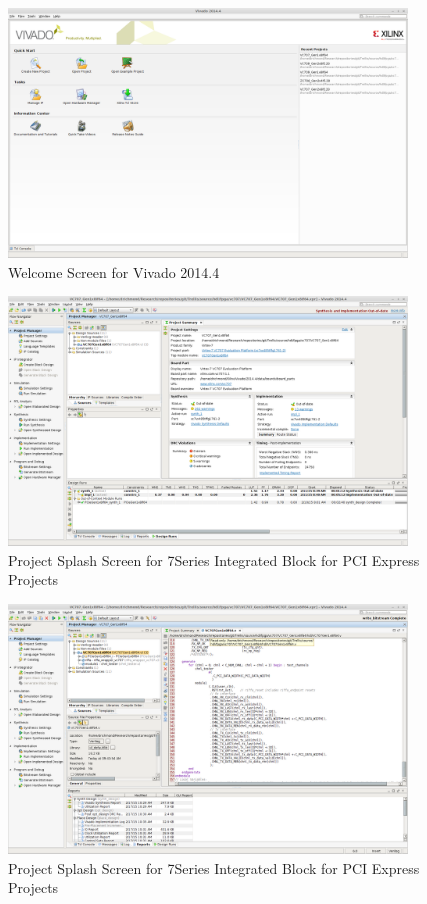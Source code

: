 \documentclass{refrep}
\newcommand{\VivadoVer}{2014.4}
\begin{document}
\begin{figure}
  \includegraphics[width=400px,center]{VivadoWelcomeScreen.png}
  \caption{Welcome Screen for Vivado \VivadoVer}
  \label{Fig:Vivado:WelcomeScreen}
\end{figure}
\begin{figure}
  \includegraphics[width=400px,center]{7SeriesIntegratedOpenProject.png}
  \caption{Project Splash Screen for 7Series Integrated Block for PCI Express Projects}
  \label{Fig:7SeriesIntegrated:ExampleDesign:ProjectOpened}
\end{figure}
\begin{figure}
  \includegraphics[width=400px,trim=500 200 200 250, clip=true,center]{VivadoChnlTesterInstantiation.png}
  \caption{Project Splash Screen for 7Series Integrated Block for PCI Express Projects}
  \label{Fig:Vivado:ExampleDesign:chnl_tester}
\end{figure}
\end{document}
